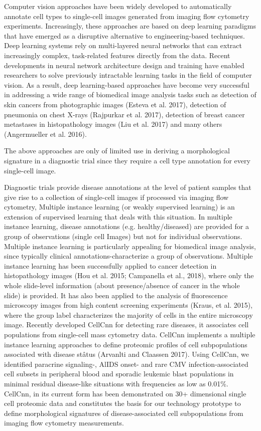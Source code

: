 Computer vision approaches have been widely developed to automatically annotate cell types to single-cell images generated from imaging flow cytometry experiments. Increasingly, these approaches are based on deep learning paradigms that have emerged as a disruptive alternative to engineering-based techniques. Deep learning systems rely on multi-layered neural networks that can extract increasingly complex, task-related features directly from the data. 
Recent developments in neural network architecture design and training have enabled researchers to solve previously intractable learning tasks in the field of computer vision. As a result, deep learning-based approaches have become very successful in addressing a wide range of biomedical image analysis tasks such as detection of skin cancers from photographic images (Esteva et al. 2017), detection of pneumonia on chest X-rays (Rajpurkar et al. 2017), detection of breast cancer metastases in histopathology images (Liu et al. 2017) and many others (Angermueller et al. 2016). 

The above approaches are only of limited use in deriving a morphological signature in a diagnostic trial since they require a cell type annotation for every single-cell image.

Diagnostic trials provide disease annotations at the level of patient samples that give rise to a collection of single-cell images if processed via imaging flow cytometry, Multiple instance learning (or weakly supervised learning) is an extension of supervised learning that deals with this situation.  In multiple instance learning, disease annotations (e.g. healthy/diseased) are provided for a group of observations (single cell Images) but not for individual observations. Multiple instance learning is particularly appealing for biomedical image analysis, since typically clinical annotations-characterize a group of observations. Multiple instance learning has been successfully applied to cancer detection in histopathology images (Hou et al. 2015; Campanella et al., 2018), where only the whole slide-level information (about presence/absence of cancer in the whole slide) is provided. It has also been applied to the analysis of fluorescence microscopy images from high content screening experiments (Kraus, et al. 2015), where the group label characterizes the majority of cells in the entire microscopy image. Recently developed CellCnn for detecting rare diseases, it associates cell populations from single-cell mass cytometry data. CellCnn implements a multiple instance learning approaches to define proteomic profiles of cell subpopulations associated with disease stâtus (Arvanlti and Claassen 2017). Using CellCnn, we identified paracrine signaling-, AlIDS onset- and rare CMV infection-associated cell subsets in peripheral blood and sporadic leukemic blast populations in minimal residual disease-like situations with frequencies as low as 0.01\%. CellCnn, in its current form has been demonstrated on 30+ dimensional single cell proteomic data and constitutes the basis for our technology prototype to define morphological signatures of disease-associated cell subpopulations from imaging flow cytometry measurements.



